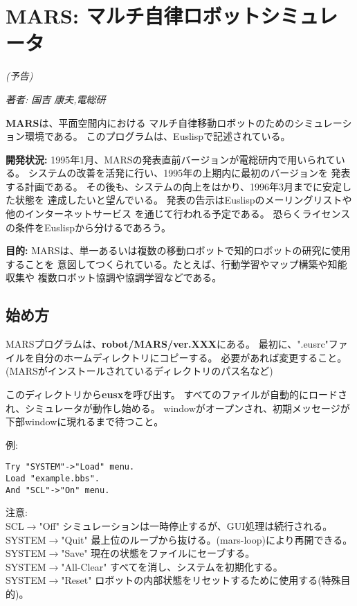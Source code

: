 \newpage

\section{\label{MARS} MARS: マルチ自律ロボットシミュレータ}
\hfill {\Large \em (予告)}

\hfill {\em 著者: 国吉 康夫,電総研}

{\bf MARS}は、平面空間内における
マルチ自律移動ロボットのためのシミュレーション環境である。
このプログラムは、Euslispで記述されている。

{\bf 開発状況:}
1995年1月、MARSの発表直前バージョンが電総研内で用いられている。
システムの改善を活発に行い、1995年の上期内に最初のバージョンを
発表する計画である。
その後も、システムの向上をはかり、1996年3月までに安定した状態を
達成したいと望んでいる。
発表の告示はEuslispのメーリングリストや他のインターネットサービス
を通じて行われる予定である。
恐らくライセンスの条件をEuslispから分けるであろう。

{\bf 目的:}
MARSは、単一あるいは複数の移動ロボットで知的ロボットの研究に使用することを
意図してつくられている。たとえば、行動学習やマップ構築や知能収集や
複数ロボット協調や協調学習などである。


\subsection{始め方}
MARSプログラムは、{\bf robot/MARS/ver.XXX}にある。
最初に、".eusrc"ファイルを自分のホームディレクトリにコピーする。
必要があれば変更すること。
(MARSがインストールされているディレクトリのパス名など)

このディレクトリから{\bf eusx}を呼び出す。
すべてのファイルが自動的にロードされ、シミュレータが動作し始める。
windowがオープンされ、初期メッセージが下部windowに現れるまで待つこと。

例:
\begin{verbatim}
Try "SYSTEM"->"Load" menu.
Load "example.bbs".
And "SCL"->"On" menu.
\end{verbatim}

注意:\\
SCL$\rightarrow$"Off" シミュレーションは一時停止するが、GUI処理は続行される。\\
SYSTEM$\rightarrow$"Quit" 最上位のループから抜ける。(mars-loop)により再開できる。\\
SYSTEM$\rightarrow$"Save" 現在の状態をファイルにセーブする。\\
SYSTEM$\rightarrow$"All-Clear" すべてを消し、システムを初期化する。\\
SYSTEM$\rightarrow$"Reset" ロボットの内部状態をリセットするために使用する(特殊目的)。\\

